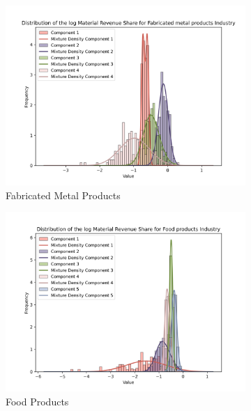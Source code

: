 \documentclass{article}
\begin{document}
\begin{figure}[ht!]
    \centering 
    \begin{subfigure}[t]{0.32\textwidth}
        \centering
        \includegraphics[width=\textwidth]{figure/empirical_error_kmshare_ciiu_Fabricated metal products.png}
        \caption{Fabricated Metal Products}
    \end{subfigure}
    \begin{subfigure}[t]{0.32\textwidth}
        \centering
        \includegraphics[width=\textwidth]{figure/empirical_error_kmshare_ciiu_Food products.png}
        \caption{Food Products}
    \end{subfigure}
    \begin{subfigure}[t]{0.32\textwidth}

\end{subfigure}
\end{figure}
\end{document}
